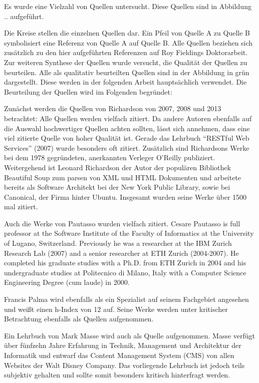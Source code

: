 Es wurde eine Vielzahl von Quellen untersucht. Diese Quellen sind in Abbildung .. aufgeführt. 

Die Kreise stellen die einzelnen Quellen dar. Ein Pfeil von Quelle A zu Quelle B symbolisiert eine Referenz von Quelle A auf Quelle B. Alle Quellen beziehen sich zusätzlich zu den hier aufgeführten Referenzen auf Roy Fieldings Doktorarbeit. Zur weiteren Synthese der Quellen wurde versucht, die Qualität der Quellen zu beurteilen. Alle als qualitativ beurteilten Quellen sind in der Abbildung in grün dargestellt. Diese werden in der folgenden Arbeit hauptsächlich verwendet. Die Beurteilung der Quellen wird im Folgenden begründet:

Zunächst werden die Quellen von Richardson von 2007, 2008 und 2013 betrachtet: Alle Quellen werden vielfach zitiert. Da andere Autoren ebenfalls auf die Auswahl hochwertiger Quellen achten sollten, lässt sich annehmen, dass eine viel zitierte Quelle von hoher Qualität ist. Gerade das Lehrbuch “RESTful Web Services” (2007) wurde besonders oft zitiert. Zusätzlich sind Richardsons Werke bei dem 1978 gegründeten, anerkannten Verleger O’Reilly publiziert. Weitergehend ist Leonard Richardson der Autor der populären  Bibliothek Beautiful Soup zum parsen von XML und HTML Dokumenten  und arbeitete bereits als Software Architekt bei der New York Public Library, sowie bei Canonical, der Firma hinter Ubuntu. Insgesamt wurden seine Werke über 1500 mal zitiert.

Auch die Werke von Pautasso wurden vielfach zitiert. Cesare Pautasso is full professor at the Software Institute of the Faculty of Informatics at the University of Lugano, Switzerland. Previously he was a researcher at the IBM Zurich Research Lab (2007) and a senior researcher at ETH Zurich (2004-2007). He completed his graduate studies with a Ph.D. from ETH Zurich in 2004 and his undergraduate studies at Politecnico di Milano, Italy with a Computer Science Engineering Degree (cum laude) in 2000.

Francis Palma wird ebenfalls als ein Spezialist auf seinem Fachgebiet angesehen und weißt einen h-Index von 12 auf. Seine Werke werden unter kritischer Betrachtung ebenfalls als Quellen aufgenommen.

Ein Lehrbuch von Mark Masse wird auch als Quelle aufgenommen. Masse verfügt über fünfzehn Jahre Erfahrung in Technik, Management und Architektur der Informatik und entwarf das Content Management System (CMS) von allen Websites der Walt Disney Company. Das vorliegende Lehrbuch ist jedoch teils subjektiv gehalten und sollte somit besonders kritisch hinterfragt werden.

